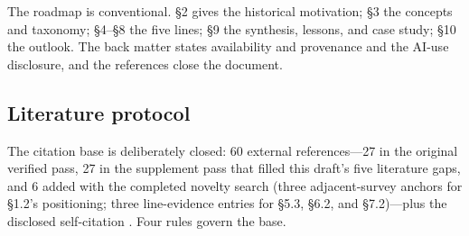 \documentclass[11pt,a4paper]{article}
\begin{document}
The roadmap is conventional. §2 gives the historical motivation; §3 the concepts and taxonomy; §4–§8 the five lines; §9 the synthesis, lessons, and case study; §10 the outlook. The back matter states availability and provenance and the AI-use disclosure, and the references close the document.

\subsection{Literature protocol}

The citation base is deliberately closed: 60 external references—27 in the original verified pass, 27 in the supplement pass that filled this draft's five literature gaps, and 6 added with the completed novelty search (three adjacent-survey anchors for §1.2's positioning; three line-evidence entries for §5.3, §6.2, and §7.2)—plus the disclosed self-citation \cite{key04}. Four rules govern the base.
\end{document}
